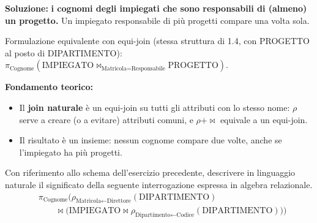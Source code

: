 \documentclass[12pt, a4paper]{article}
\newcounter{esercizio}[section]
\begin{document}
\textbf{Soluzione:} \textbf{i cognomi degli impiegati che sono responsabili di (almeno) un progetto.} Un impiegato responsabile di più progetti compare una volta sola.

Formulazione equivalente con equi-join (stessa struttura di 1.4, con PROGETTO al posto di DIPARTIMENTO): $\pi_{\text{Cognome}}(\text{IMPIEGATO}\bowtie_{\text{Matricola}=\text{Responsabile}}\text{PROGETTO})$.

\textbf{Fondamento teorico:}
\begin{itemize}
\item Il \textbf{join naturale} è un equi-join su tutti gli attributi con lo stesso nome: $\rho$ serve a creare (o a evitare) attributi comuni, e $\rho+\bowtie$ equivale a un equi-join.
\item Il risultato è un insieme: nessun cognome compare due volte, anche se l'impiegato ha più progetti.
\end{itemize}

\begin{tcolorbox}[colback=lightergray!10, colframe=tocsec, title=\textbf{Esercizio 2.2}]
Con riferimento allo schema dell'esercizio precedente, descrivere in linguaggio naturale il significato della seguente interrogazione espressa in algebra relazionale.
\begin{align*}
&\pi_{\text{Cognome}}\Big(\rho_{\text{Matricola}\leftarrow\text{Direttore}}(\text{DIPARTIMENTO})\\
&\qquad\bowtie\big(\text{IMPIEGATO}\bowtie\rho_{\text{Dipartimento}\leftarrow\text{Codice}}(\text{DIPARTIMENTO})\big)\Big)
\end{align*}
\end{tcolorbox}
\end{document}
